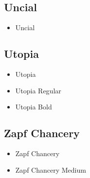     \subsection{Uncial}
    \begin{itemize}
        \item {\selectfont Uncial}
    \end{itemize}


    \subsection{Utopia}
    \begin{itemize}
        \item {\selectfont Utopia}
        \item {\selectfont Utopia Regular}
        \item {\selectfont Utopia Bold}
    \end{itemize}


    \subsection{Zapf Chancery}
    \begin{itemize}
        \item {\selectfont Zapf Chancery}
        \item {\selectfont Zapf Chancery Medium}
    \end{itemize}


